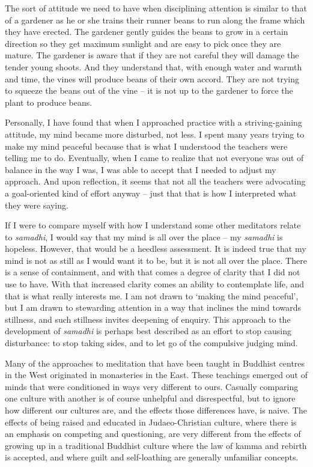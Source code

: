 The sort of attitude we need to have when disciplining attention is
similar to that of a gardener as he or she trains their
runner beans\cite{beans} to run along the frame which they have erected. The
gardener gently guides the beans to grow in a certain direction so they
get maximum sunlight and are easy to pick once they are mature. The
gardener is aware that if they are not careful they will damage the
tender young shoots. And they understand that, with enough water and
warmth and time, the vines will produce beans of their own accord. They
are not trying to squeeze the beans out of the vine -- it is not up to
the gardener to force the plant to produce beans.

Personally, I have found that when I approached practice with a
striving-gaining attitude, my mind became more disturbed, not less. I
spent many years trying to make my mind peaceful because that is what I
understood the teachers were telling me to do. Eventually, when I came
to realize that not everyone was out of balance in the way I was, I was
able to accept that I needed to adjust my approach. And upon reflection,
it seems that not all the teachers were advocating a goal-oriented kind
of effort anyway -- just that that is how I interpreted what they were
saying.

If I were to compare myself with how I understand some other meditators
relate to \emph{samadhi}, I would say that my mind is all over the place
-- my \emph{samadhi} is hopeless. However, that would be a heedless
assessment. It is indeed true that my mind is not as still as I would
want it to be, but it is not all over the place. There is a sense of
containment, and with that comes a degree of clarity that I did not use
to have. With that increased clarity comes an ability to contemplate
life, and that is what really interests me. I am not drawn to `making
the mind peaceful', but I am drawn to stewarding attention in a way that
inclines the mind towards stillness, and such stillness invites
deepening of enquiry. This approach to the development of \emph{samadhi}
is perhaps best described as an effort to stop causing disturbance: to
stop taking sides, and to let go of the compulsive judging mind.

Many of the approaches to meditation that have been taught in Buddhist
centres in the West originated in monasteries in the East. These
teachings emerged out of minds that were conditioned in ways very
different to ours. Casually comparing one culture with another is of
course unhelpful and disrespectful, but to ignore how different our
cultures are, and the effects those differences have, is naive. The
effects of being raised and educated in Judaeo-Christian culture, where
there is an emphasis on competing and questioning, are very different
from the effects of growing up in a traditional Buddhist culture where
the law of kamma and rebirth is accepted, and where guilt and
self-loathing are generally unfamiliar concepts.

